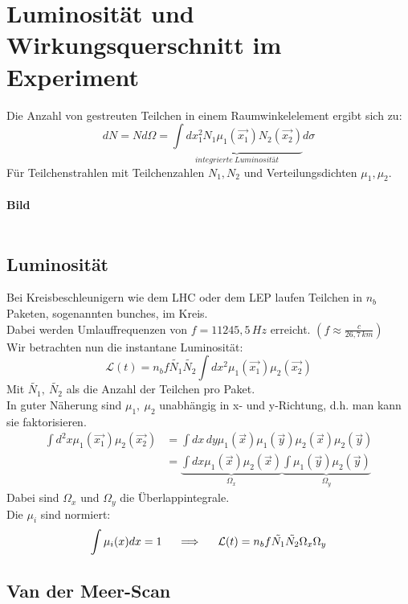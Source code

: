 \chapter{Luminosität und Wirkungsquerschnitt im Experiment}

Die Anzahl von gestreuten Teilchen in einem Raumwinkelelement ergibt sich zu:
\[ dN = N d\Omega = \underbrace{\int d x_1^2 N_1 \mu_1 (\vec{x_1}) N_2 
(\vec{x_2})}_{\mathit{integrierte\ Luminosität}} d\sigma \]
Für Teilchenstrahlen mit Teilchenzahlen $N_1, N_2$ und Verteilungsdichten 
$\mu_1, \mu_2$. \\
\\
\textbf{Bild}\\
\\

\section{Luminosität}

Bei Kreisbeschleunigern wie dem LHC oder dem LEP laufen Teilchen in $n_b$ 
Paketen, sogenannten bunches, im Kreis. \\
Dabei werden Umlauffrequenzen von $f = 11245,5\,Hz$ erreicht. $\left( f \approx 
\frac{c}{26,7\,km} \right) $ \\
Wir betrachten nun die instantane Luminosität: 
\[ \mathcal{L} (t) = n_b f \tilde{N_1} \tilde{N_2} \int dx^2 \mu_1(\vec{x_1}) 
\mu_2(\vec{x_2})  \]
Mit $ \tilde{N_1},\ \tilde{N_2}$ als die Anzahl der Teilchen pro Paket. \\
In guter Näherung sind $\mu_1,\ \mu_2$ unabhängig in x- und y-Richtung, d.h. 
man kann sie faktorisieren. 
\begin{align*}
\int d^2x \mu_1(\vec{x_1}) \mu_2(\vec{x_2}) &= \int dx\, dy \mu_1(\vec{x}) 
\mu_1(\vec{y}) \mu_2(\vec{x}) \mu_2(\vec{y}) \\
&= \underbrace{\int dx \mu_1(\vec{x}) \mu_2(\vec{x})}_{\Omega_x} 
\underbrace{\int \mu_1(\vec{y}) \mu_2(\vec{y})}_{\Omega_y}
\end{align*}  
Dabei sind $\Omega_x$ und $\Omega_y$ die Überlappintegrale.\\
Die $\mu_i$ sind normiert:
\[ \int \mu_i (x) dx = 1 \hspace{0.5cm} \Longrightarrow \hspace{0.5cm} 
\mathcal{L}(t) = n_b f \tilde{N_1} \tilde{N_2} \Omega_x \Omega_y \]

\section{Van der Meer-Scan}

